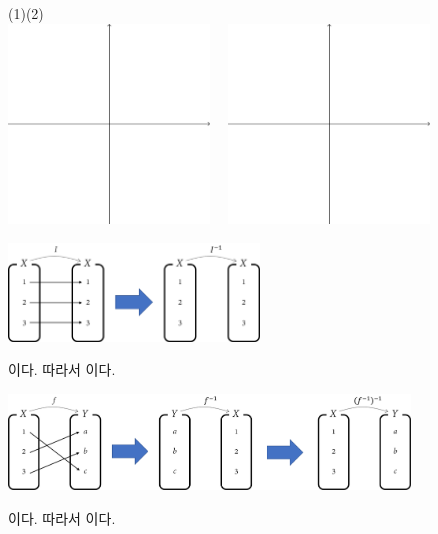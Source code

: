 \documentclass{oblivoir}
\begin{document}
%
\label{inverse9}
\begin{center}
(1)\hspace{130pt}(2)\\[10pt]
\includegraphics[width=0.4\textwidth]{xyaxes}~~
\includegraphics[width=0.4\textwidth]{xyaxes}
\end{center}


\newpage
%
\label{inverse10}
\vspace{-20pt}
\begin{center}
\includegraphics[width=0.5\textwidth]{inverse_10}
\end{center}
이다.
따라서
이다.

%
\label{inverse11}
\vspace{-20pt}
\begin{center}
\includegraphics[width=0.8\textwidth]{inverse_11}
\end{center}
이다.
따라서
이다.
\end{document}

